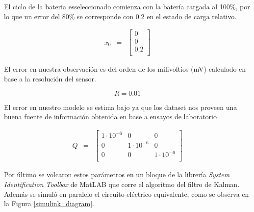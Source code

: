\documentclass[10pt,a4paper]{article}
\begin{document}
    \noindent El ciclo de la bateria esseleccionado comienza con la batería 
    cargada al 100\%, por lo que un error del 80\% se corresponde con 0.2 en el 
    estado de carga relativo.

	\begin{equation}
		\begin{array}{llll}
			x_0 & = & \begin{bmatrix}
				0 \\
				0 \\
				0.2 \\
			\end{bmatrix} 
		\end{array} \nonumber
	\end{equation}

    \noindent El error en nuestra observación es del orden de los milivoltios
    (mV) calculado en base a la resolución del sensor.

	\begin{equation}
		R = 0.01  \nonumber
	\end{equation}
	
	\noindent El error en nuestro modelo se estima bajo ya que los dataset nos 
    proveen una buena fuente de información obtenida en base a ensayos de 
    laboratorio

	\begin{equation}
		\begin{array}{llll}
			Q & = & \begin{bmatrix}
				1\cdot10^{-6} & 0 & 0 \\
				0 & 1\cdot10^{-6} & 0 \\
				0 & 0 & 1\cdot10^{-6} \\
			\end{bmatrix} 
		\end{array} \nonumber
	\end{equation}
	
	\clearpage
	
	\noindent Por último se volcaron estos parámetros en un bloque de la 
    librería \emph{System Identification Toolbox} de MatLAB que corre el 
    algoritmo del filtro de Kalman. Además se simuló en paralelo el circuito 
    eléctrico equivalente, como se observa en la Figura \ref{simulink_diagram}.
\end{document}
